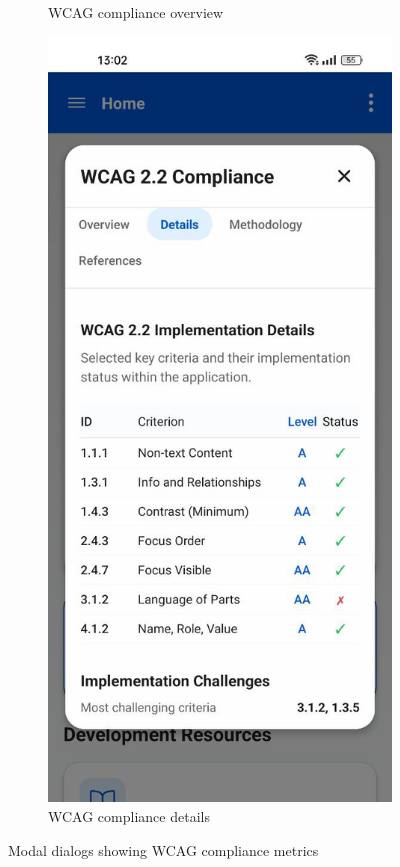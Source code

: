 \begin{figure}[ht]
\begin{subfigure}[b]{0.48\textwidth}
        \caption{WCAG compliance overview}
        \label{fig:wcag-compliance-modal}
    \end{subfigure}
    \hfill
    \begin{subfigure}[b]{0.48\textwidth}
        \centering
        \includegraphics[width=\linewidth]{img/wcag-compliance-details.jpg}
        \caption{WCAG compliance details}
        \label{fig:wcag-details-modal}
    \end{subfigure}
    \caption{Modal dialogs showing WCAG compliance metrics}
    \label{fig:wcag_modal_pair}
\end{figure}

